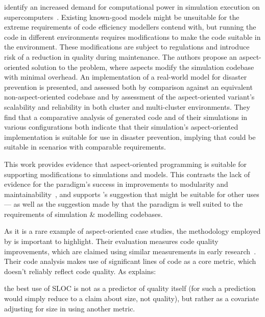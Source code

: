 \citeauthor{ionescu2009aspect} identify an increased demand for computational power in
simulation execution on supercomputers~\cite{ionescu2009aspect}. Existing
known-good models might be unsuitable for the extreme requirements of code
efficiency modellers contend with, but running the code in different
environments requires modifications to make the code suitable in the
environment. These modifications are subject to regulations and introduce risk
of a reduction in quality during maintenance. The authors propose an
aspect-oriented solution to the problem, where aspects modify the simulation
codebase with minimal overhead. An implementation of a real-world model for
disaster prevention is presented, and assessed both by comparison against an
equivalent non-aspect-oriented codebase and by assessment of the aspect-oriented
variant's scalability and reliability in both cluster and multi-cluster
environments. They find that a comparative analysis of generated code and of
their simulations in various configurations both indicate that their
simulation's aspect-oriented implementation is suitable for use in disaster
prevention, implying that \aspectorientation{} could be suitable in scenarios with
comparable requirements.

This work provides evidence that aspect-oriented programming is suitable for
supporting modifications to simulations and models. This contrasts the lack of
evidence for the paradigm's success in improvements to modularity and
maintainability~\cite{przybylek2010wrong,Constantinides04aopconsidered}, and
supports \citet{steimann06paradoxical}'s suggestion that \aspectorientation{}
might be suitable for other uses --- as well as the suggestion made by
\citet{gulyas1999use} that the paradigm is well suited to the requirements of
simulation \& modelling codebases.

As it is a rare example of aspect-oriented case studies, the methodology
employed by \citeauthor{ionescu2009aspect} is important to highlight. Their
evaluation measures code quality improvements, which are claimed using similar
measurements in early \aspectorientation{} research~\cite{kiczales1997aspect}.
Their code analysis makes use of significant lines of code as a core metric,
which doesn't reliably reflect code quality. As \citet{rosenberg1997some}
explains:

\begin{displayquote}
    \textelp{}the best use of SLOC is not as a predictor of quality itself (for
such a prediction would simply reduce to a claim about size, not quality), but
rather as a covariate adjusting for size in using another metric.
\end{displayquote}


